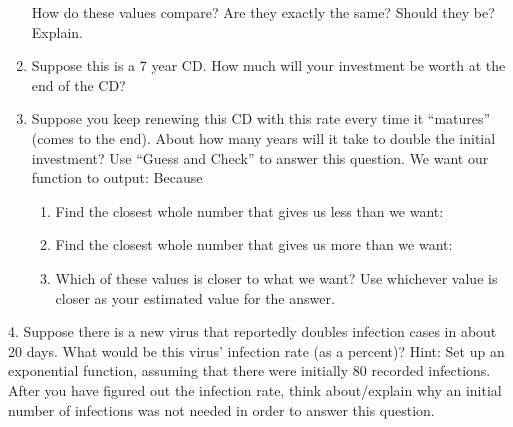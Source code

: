 \documentclass{ximera}
\begin{document}
\begin{example}
\begin{enumerate}
How do these values compare?  Are they exactly the same?  Should they be?  Explain.
\item Suppose this is a 7 year CD.  How much will your investment be worth at the end of the CD?
\item Suppose you keep renewing this CD with this rate every time it “matures” (comes to the end).  About how many years will it take to double the initial investment?
Use “Guess and Check” to answer this question.
We want our function to output:
Because 
\begin{enumerate}
\item  Find the closest whole number that gives us less than we want:
\item Find the closest whole number that gives us more than we want:
\item Which of these values is closer to what we want?  Use whichever value is closer as your estimated value for the answer.
\end{enumerate}
\end{enumerate}
\end{example}
\begin{exploration}
4.	Suppose there is a new virus that reportedly doubles infection cases in about 20 days.  What would be this virus’ infection rate (as a percent)?
Hint: Set up an exponential function, assuming that there were initially 80 recorded infections.  After you have figured out the infection rate, think about/explain why an initial number of infections was not needed in order to answer this question.

\end{exploration}
\end{document}
